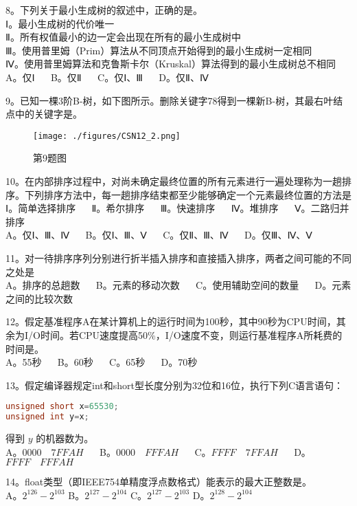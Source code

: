 8。下列关于最小生成树的叙述中，正确的是。\\
Ⅰ。最小生成树的代价唯一\\
Ⅱ。所有权值最小的边一定会出现在所有的最小生成树中\\
Ⅲ。使用普里姆（Prim）算法从不同顶点开始得到的最小生成树一定相同\\
Ⅳ。使用普里姆算法和克鲁斯卡尔（Kruskal）算法得到的最小生成树总不相同\\
A。仅Ⅰ $\quad$ B。仅Ⅱ $\quad$ C。仅Ⅰ、Ⅲ $\quad$ D。仅Ⅱ、Ⅳ

9。已知一棵3阶B-树，如下图所示。删除关键字78得到一棵新B-树，其最右叶结点中的关键字是。\\
\begin{figure}[ht]
\centering
\texttt{[image: ./figures/CSN12\_2.png]}
\caption{第9题图} \label{CSN12_fig2}
\end{figure}

10。在内部排序过程中，对尚未确定最终位置的所有元素进行一遍处理称为一趟排序。下列排序方法中，每一趟排序结束都至少能够确定一个元素最终位置的方法是\\
Ⅰ。简单选择排序 $\quad$ Ⅱ。希尔排序 $\quad$ Ⅲ。快速排序 $\quad$ Ⅳ。堆排序 $\quad$ Ⅴ。二路归并排序\\
A。仅Ⅰ、Ⅲ、Ⅳ $\quad$ B。仅Ⅰ、Ⅲ、Ⅴ $\quad$ C。仅Ⅱ、Ⅲ、Ⅳ $\quad$ D。仅Ⅲ、Ⅳ、Ⅴ

11。对一待排序序列分别进行折半插入排序和直接插入排序，两者之间可能的不同之处是\\
A。排序的总趟数 $\quad$ B。元素的移动次数 $\quad$ C。使用辅助空间的数量 $\quad$ D。元素之间的比较次数

12。假定基准程序A在某计算机上的运行时间为100秒，其中90秒为CPU时间，其余为I/O时间。若CPU速度提高50\%，I/O速度不变，则运行基准程序A所耗费的时间是。\\
A。55秒 $\quad$ B。60秒 $\quad$ C。65秒 $\quad$ D。70秒

13。假定编译器规定int和short型长度分别为32位和16位，执行下列C语言语句：\\
\begin{lstlisting}[language=cpp]
unsigned short x=65530;
unsigned int y=x;
\end{lstlisting}
得到 $y$ 的机器数为。\\
A。$0000 \quad 7FFAH$ $\quad$ B。$0000 \quad FFFAH$ $\quad$ C。$FFFF \quad 7FFAH$ $\quad$ D。$FFFF \quad FFFAH$

14。float类型（即IEEE754单精度浮点数格式）能表示的最大正整数是。\\
A。$2^{126}-2^{103}$ B。$2^{127}-2^{104}$ C。$2^{127}-2^{103}$ D。$2^{128}-2^{104}$

